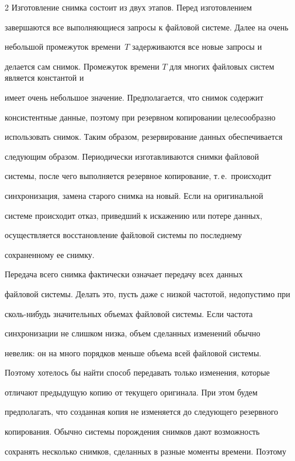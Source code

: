\begin{multicols}{2}
Изготовление снимка состоит из двух этапов. Перед изготовлением 


завершаются все выполняющиеся запросы к файловой системе. Далее на очень 


небольшой промежуток времени~$T$ задерживаются все новые запросы и 


делается сам снимок. Промежуток времени $T$ для многих файловых сис\-тем является константой и 


имеет очень небольшое значение. Предполагается, что снимок содержит 


консистентные данные, поэтому при резервном копировании целесообразно 


использовать снимок. Таким образом, резервирование данных обеспечивается 


следующим образом. Периодически из\-го\-тав\-ли\-ва\-ют\-ся снимки файловой 


сис\-те\-мы, после чего выполняется резервное копирование, т.\,е.\ происходит 


синхронизация, замена старого снимка на новый. Если на оригинальной 


сис\-те\-ме происходит отказ, приведший к искажению или потере данных, 


осуществляется восстановление файловой системы по последнему 


сохраненному ее снимку.


      


      Передача всего снимка фактически означает передачу всех данных 


файловой системы. Делать это, пусть даже с низкой частотой, недопустимо при 


сколь-нибудь значительных объемах файловой сис\-те\-мы. Если частота  


синхронизации не слишком низка, объем сделанных изменений обычно 


невелик: он на много порядков меньше объема всей файловой сис\-те\-мы. 


Поэтому хотелось бы \mbox{найти} способ передавать только изменения, которые 


отличают предыдущую копию от текущего оригинала. При этом будем 


предполагать, что созданная копия не изменяется до следующего резервного 


копирования. Обычно сис\-те\-мы порождения снимков дают возможность 


сохранять несколько снимков, сделанных в разные моменты времени. Поэтому 



\end{multicols}
